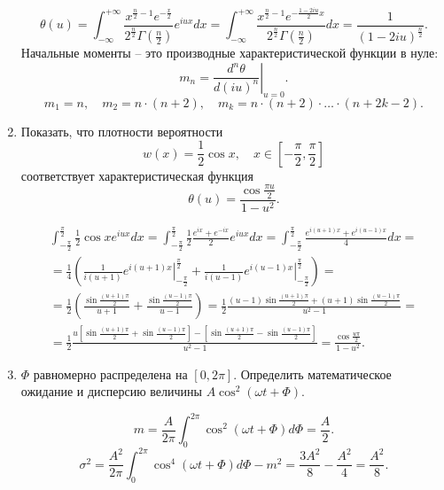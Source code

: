 \begin{enumerate}
        \[
            \theta(u) = \int_{-\infty}^{+\infty}
                \frac{x^{\frac{n}{2}-1}e^{-\frac{x}{2}}}
                {2^\frac{n}{2}\Gamma\left(\frac{n}{2}\right)} e^{iux} dx =
                \int_{-\infty}^{+\infty}
                \frac{x^{\frac{n}{2}-1}e^{-\frac{1 - 2iu}{2}x}}
                {2^\frac{n}{2}\Gamma\left(\frac{n}{2}\right)} dx =
                \frac{1}{(1-2iu)^\frac{n}{2}}.
        \]
        Начальные моменты -- это производные характеристической функции в нуле:
        \[
            m_n = \left.\frac{d^n\theta}{d(iu)^n}\right|_{u=0}.
        \]
        \[
            m_1 = n,\quad m_2 = n\cdot(n+2),\quad
            m_k = n\cdot(n+2)\cdot\ldots\cdot(n+2k-2).
        \]
    \item Показать, что плотности вероятности
        \[
            w(x) = \frac{1}{2}\cos x,\quad
            x\in\left[-\frac{\pi}{2},\frac{\pi}{2}\right]
        \]
        соответствует характеристическая функция
        \[
            \theta(u) = \frac{\cos\frac{\pi u}{2}}{1-u^2}.
        \]

        \begin{gather*}
            \int_{-\frac{\pi}{2}}^\frac{\pi}{2} \frac{1}{2}\cos x e^{iux} dx =
            \int_{-\frac{\pi}{2}}^\frac{\pi}{2}
                \frac{1}{2}\frac{e^{ix}+e^{-ix}}{2} e^{iux} dx =
            \int_{-\frac{\pi}{2}}^\frac{\pi}{2}
                \frac{e^{i(u+1)x} + e^{i(u-1)x}}{4} dx = \\ =
            \frac{1}{4}\left(\frac{1}{i(u+1)}
            \left.e^{i(u+1)x}\right|_{-\frac{\pi}{2}}^\frac{\pi}{2} +
            \frac{1}{i(u-1)}
            \left.e^{i(u-1)x}\right|_{-\frac{\pi}{2}}^\frac{\pi}{2}\right) =\\=
            \frac{1}{2}\left(\frac{\sin\frac{(u+1)\pi}{2}}{u+1} +
            \frac{\sin\frac{(u-1)\pi}{2}}{u-1} \right) =
            \frac{1}{2}\frac{(u-1)\sin\frac{(u+1)\pi}{2} +
            (u+1)\sin\frac{(u-1)\pi}{2}}{u^2-1} =\\=
            \frac{1}{2}
            \frac{u\left[\sin\frac{(u+1)\pi}{2} + \sin\frac{(u-1)\pi}{2}\right]-
            \left[\sin\frac{(u+1)\pi}{2} - \sin\frac{(u-1)\pi}{2}\right]}{u^2-1} =
            \frac{\cos\frac{u\pi}{2}}{1-u^2}.
        \end{gather*}
    \item \( \Phi \) равномерно распределена на \( [0, 2\pi] \). Определить
        математическое ожидание и дисперсию величины
        \( A\cos^2(\omega t + \Phi) \).

        \[
            m = \frac{A}{2\pi}\int_0^{2\pi}\cos^2(\omega t + \Phi) d\Phi =
            \frac{A}{2}.
        \]
        \[
            \sigma^2 =
                \frac{A^2}{2\pi}\int_0^{2\pi}\cos^4(\omega t + \Phi) d\Phi - m^2
                = \frac{3A^2}{8} - \frac{A^2}{4} = \frac{A^2}{8}.
        \]
\end{enumerate}
